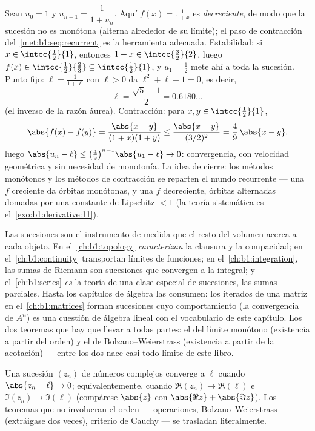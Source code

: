 \begin{example}\label{ex:b1:seq:golden}
Sean $u_0 = 1$ y $u_{n+1} = \dfrac{1}{1 + u_n}$. Aquí
$f(x) = \frac{1}{1+x}$ es \emph{decreciente}, de modo que la sucesión
no es monótona (alterna alrededor de su límite); el paso de
contracción del~\cref{met:b1:seq:recurrent} es la herramienta
adecuada. Estabilidad: si $x \in \intcc{\frac12}{1}$, entonces
$1 + x \in \intcc{\frac32}{2}$, luego $f(x) \in
\intcc{\frac12}{\frac23} \subseteq \intcc{\frac12}{1}$, y
$u_1 = \frac12$ mete ahí a toda la sucesión. Punto fijo:
$\ell = \frac{1}{1+\ell}$ con $\ell > 0$ da $\ell^2 + \ell - 1 = 0$,
es decir,
\[
\ell = \frac{\sqrt5 - 1}{2} = 0.6180\dots
\]
(el inverso de la razón áurea). Contracción: para
$x, y \in \intcc{\frac12}{1}$,
\[
\abs{f(x) - f(y)} = \frac{\abs{x - y}}{(1+x)(1+y)}
\leq \frac{\abs{x-y}}{(3/2)^2} = \frac49\,\abs{x - y} ,
\]
luego $\abs{u_n - \ell} \leq \bigl(\frac49\bigr)^{n-1}\abs{u_1 -
\ell} \to 0$: convergencia, con velocidad geométrica y sin necesidad
de monotonía. La idea de cierre: los métodos monótonos y los métodos
de contracción se reparten el mundo recurrente --- una $f$ creciente
da órbitas monótonas, y una $f$ decreciente, órbitas alternadas
domadas por una constante de Lipschitz $< 1$ (la teoría sistemática es
el~\cref{exo:b1:derivative:11}).
\end{example}

\begin{remark}
Las sucesiones son el instrumento de medida que el resto del volumen
acerca a cada objeto. En el~\cref{ch:b1:topology} \emph{caracterizan}
la clausura y la compacidad; en el~\cref{ch:b1:continuity} transportan
límites de funciones; en el~\cref{ch:b1:integration}, las sumas de
Riemann son sucesiones que convergen a la integral; y
el~\cref{ch:b1:series} \emph{es} la teoría de una clase especial de
sucesiones, las sumas parciales. Hasta los capítulos de álgebra las
consumen: los iterados de una matriz en el~\cref{ch:b1:matrices} forman
sucesiones cuyo comportamiento (la convergencia de $A^n$) es una
cuestión de álgebra lineal con el vocabulario de este capítulo. Los dos
teoremas que hay que llevar a todas partes: el del límite monótono
(existencia a partir del orden) y el de Bolzano--Weierstrass
(existencia a partir de la acotación) --- entre los dos nace casi todo
límite de este libro.
\end{remark}

\begin{remark}
Una sucesión $(z_n)$ de números complejos converge a $\ell$ cuando
$\abs{z_n - \ell} \to 0$; equivalentemente, cuando
$\Re(z_n) \to \Re(\ell)$ e $\Im(z_n) \to \Im(\ell)$ (compárese
$\abs{z}$ con $\abs{\Re z} + \abs{\Im z}$). Los teoremas que no
involucran el orden --- operaciones, Bolzano--Weierstrass (extráigase
dos veces), criterio de Cauchy --- se trasladan literalmente.
\end{remark}

